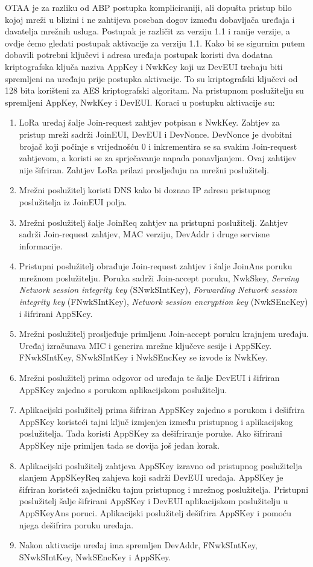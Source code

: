 \documentclass[times, utf8, diplomski]{fer}
\begin{document}
OTAA je za razliku od ABP postupka kompliciraniji, ali dopušta pristup bilo kojoj mreži u blizini i ne zahtijeva poseban dogov između dobavljača uređaja i davatelja mrežnih usluga. Postupak je različit za verziju 1.1 i ranije verzije, a ovdje ćemo gledati postupak aktivacije za verziju 1.1. Kako bi se sigurnim putem dobavili potrebni ključevi i adresa uređaja postupak koristi dva dodatna kriptografska ključa naziva AppKey i NwkKey koji uz DevEUI trebaju biti spremljeni na uređaju prije postupka aktivacije. To su kriptografski ključevi od 128 bita korišteni za AES kriptografski algoritam. Na pristupnom poslužitelju su spremljeni AppKey, NwkKey i DevEUI. Koraci u postupku aktivacije su:
\begin{enumerate}
    \item LoRa uređaj šalje Join-request zahtjev potpisan s NwkKey. Zahtjev za pristup mreži sadrži JoinEUI, DevEUI i DevNonce. DevNonce je dvobitni brojač koji počinje s vrijednošću 0 i inkrementira se sa svakim Join-request zahtjevom, a koristi se za sprječavanje napada ponavljanjem. Ovaj zahtijev nije šifriran. Zahtjev LoRa prilazi prosljeđuju na mrežni poslužitelj.
    \item Mrežni poslužitelj koristi DNS kako bi doznao IP adresu pristupnog poslužitelja iz JoinEUI polja.
    \item Mrežni poslužitelj šalje JoinReq zahtjev na pristupni poslužitelj. Zahtjev sadrži Join-request zahtjev, MAC verziju, DevAddr i druge servisne informacije.
    \item Pristupni poslužitelj obrađuje Join-request zahtjev i šalje JoinAns poruku mrežnom poslužitelju. Poruka sadrži Join-accept poruku, NwkSkey, \emph{Serving Network session integrity key} (SNwkSIntKey), \emph{Forwarding Network session integrity key} (FNwkSIntKey), \emph{Network session encryption key} (NwkSEncKey) i šifrirani AppSKey.
    \item Mrežni poslužitelj prosljeđuje primljenu Join-accept poruku krajnjem uređaju. Uređaj izračunava MIC i generira mrežne ključeve sesije i AppSKey. FNwkSIntKey, SNwkSIntKey i NwkSEncKey se izvode iz NwkKey.
    \item Mrežni poslužitelj prima odgovor od uređaja te šalje DevEUI i šifriran AppSKey zajedno s porukom aplikacijskom poslužitelju. 
    \item Aplikacijski poslužitelj prima šifriran AppSKey zajedno s porukom i dešifrira AppSKey koristeći tajni ključ izmjenjen između pristupnog i aplikacijskog poslužitelja. Tada koristi AppSKey za dešifriranje poruke. Ako šifrirani AppSKey nije primljen tada se dovija još jedan korak.
    \item Aplikacijski poslužitelj zahtjeva AppSKey izravno od pristupnog poslužitelja slanjem AppSKeyReq zahjeva koji sadrži DevEUI uređaja. AppSKey je šifriran koristeći zajedničku tajnu pristupnog i mrežnog poslužitelja. Pristupni poslužitelj šalje šifrirani AppSKey i DevEUI aplikacijskom poslužitelju u AppSKeyAns poruci. Aplikacijski poslužitelj dešifrira AppSKey i pomoću njega dešifrira poruku uređaja.
    \item Nakon aktivacije uređaj ima spremljen DevAddr, FNwkSIntKey, SNwkSIntKey, NwkSEncKey i AppSKey\citep{LoraWANAct}.
\end{enumerate}
\end{document}
